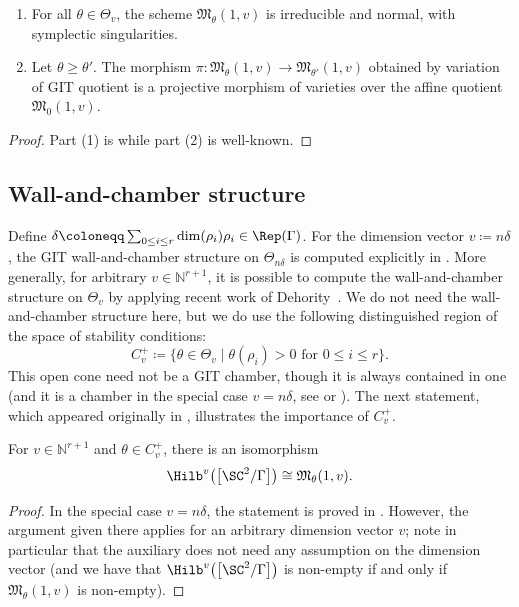 \begin{Lemma}\label{lem:quiver}\quad
\begin{enumerate}\itemsep=0pt
\item[$1.$] For all $\theta \in \Theta_v$, the scheme $\mathfrak{M}_{\theta}(1,v)$ is irreducible and normal, with symplectic singularities.
\item[$2.$] Let $ \theta \geq \theta'$. The morphism $\pi\colon \mathfrak{M}_{\theta}(1,v) \to \mathfrak{M}_{\theta'}(1,v)$ obtained by variation of GIT quotient is a projective morphism of varieties over the affine quotient $\mathfrak{M}_{0}(1,v)$.
\end{enumerate}
\end{Lemma}

\begin{proof}
Part (1) is \cite[Theorem 1.2, Proposition 3.21]{bellamy2016symplectic} while part (2) is well-known.
\end{proof}

\subsection{Wall-and-chamber structure}
\label{subsec:wallandcham}

Define $\delta\coloneqq \sum_{0\leq i\leq r} \dim(\rho_i)\rho_i\in \Rep(\Gamma)$. For the dimension vector $v\coloneqq n\delta$, the GIT wall-and-chamber structure on $\Theta_{n\delta}$ is computed explicitly in \cite[Theorem 4.6]{bellamy2020birational}. More generally, for arbitrary $v \in \mathbb{N}^{r+1}$,
it is possible to compute the wall-and-chamber structure on $\Theta_v$ by applying recent work of
Dehority~\cite[Proposition 4.8]{dehority2020affinizations}. We do not need the wall-and-chamber structure here, but we do use the following distinguished region of the space of stability conditions:
\[ C^{+}_v\coloneqq \{\theta \in \Theta_v \mid \theta(\rho_i) > 0 \textrm{ for } 0 \leq i \leq r \}. \]
This open cone need not be a GIT chamber, though it is always contained in one (and it is a chamber in the special case $v=n\delta$, see \cite[Example~2.1]{bellamy2020birational} or \cite[Section~2.8]{nakajima2009quiver}).
The next statement, which appeared originally in \cite[Section~2]{nakajima2002geometric}, illustrates the importance of $C^{+}_v$.
\begin{Proposition}
\label{prop:hilbiso}
For $v \in \mathbb{N}^{r+1}$ and $\theta \in C^{+}_v$, there is an isomorphism
\[ \Hilb^{v}\big(\big[\SC^2/\Gamma\big]\big) \cong \mathfrak{M}_{\theta}(1,v). \]
\end{Proposition}
\begin{proof}
In the special case $v=n\delta$,
the statement is proved in \cite[Theorem 4.6]{kuznetsov2007quiver}. However, the argument given there applies for
an arbitrary dimension vector $v$; note in particular that the auxiliary \cite[Corollary 3.5]{kuznetsov2007quiver}
does not need any assumption on the dimension vector (and we have that $\Hilb^{v}\big(\big[\SC^2/\Gamma\big]\big)$ is non-empty if and only if $\mathfrak{M}_{\theta}(1,v)$ is non-empty).
\end{proof}

